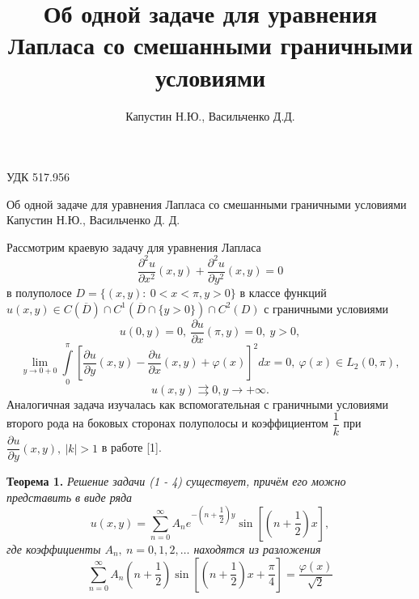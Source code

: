 \documentclass[a4paper, 9pt]{article}
\title{Об одной задаче для уравнения Лапласа со смешанными граничными условиями}
\author{Капустин Н.Ю., Васильченко Д.Д.}
\date{}
\begin{document}
	УДК 517.956
	\begin{center}		
		\LARGE{
		 Об одной задаче для уравнения Лапласа со смешанными граничными условиями
		}
		\newline
		\large{Капустин Н.Ю., Васильченко Д. Д.}
		
	\end{center}
	Рассмотрим краевую задачу для уравнения Лапласа
	\begin{equation}
		\dfrac{\partial^2 u}{\partial x^2}(x,y) +\dfrac{\partial^2 u}{\partial y^2}(x,y) = 0
	\end{equation}
	в полуполосе $D = \{(x,y) :\  0 < x < \pi, y > 0\}$\newline
	в классе функций $u(x,y) \in C(\overline{D}) \cap C^1(\overline{D} \cap \{y > 0\}) \cap C^2 (D)$ \newline
	с граничными условиями
	\begin{equation}
		u(0, y) = 0, \ \dfrac{\partial u}{\partial x} (\pi, y) = 0, \ y > 0, 
	\end{equation}
	\begin{equation}
		\lim\limits_{y \to 0 + 0} \int\limits_0^\pi \left[\dfrac{\partial u}{\partial y}(x,y) - \dfrac{\partial u}{\partial x}(x,y) + \varphi(x) \right]^2 dx = 0, \ \varphi(x) \in L_2(0,\pi) , 
	\end{equation}
	\begin{equation}
		u(x,y) \rightrightarrows 0, y \to +\infty. 
	\end{equation}
	Аналогичная задача изучалась как вспомогательная с граничными условиями второго рода на боковых сторонах полуполосы и коэффициентом $\dfrac{1}{k}$ при $\dfrac{\partial u}{\partial y}(x,y),\ |k| > 1$ в работе [1].
	\par
	\textbf{Теорема 1.} \textit{Решение задачи (1 - 4) существует, причём его можно представить в виде ряда}
		\begin{equation}
			u(x,y) = \sum\limits_{n=0}^{\infty} A_n e^{-\left(n + \dfrac12\right)y} \sin{\left[\left(n + \dfrac12\right)x\right]},
		\end{equation}
		\textit{где коэффициенты $A_n, \ n =0,1,2, \dots$ находятся из разложения}
		\begin{equation}
			\sum\limits_{n=0}^{\infty} A_n \left(n + \dfrac12 \right) \sin{\left[\left(n +\dfrac12\right)x + \dfrac\pi4\right]} = \dfrac{\varphi(x)}{\sqrt2}
		\end{equation}
	
\end{document}
